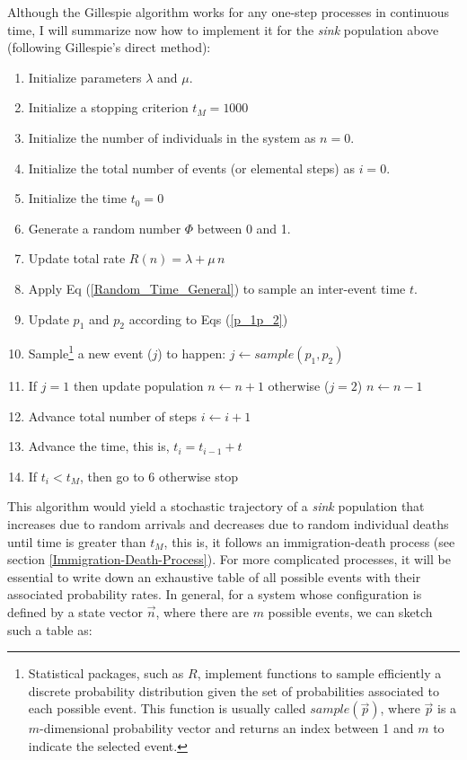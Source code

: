 Although the Gillespie algorithm works for any one-step processes in continuous time, I will summarize now how to implement it for the \textit{sink} population above (following Gillespie's direct method):
\begin{enumerate}
	\item Initialize parameters $\lambda$ and $\mu$. 
	\item Initialize a stopping criterion $t_M = 1000$
	\item Initialize the number of individuals in the system as $n=0$.
	\item Initialize the total number of events (or elemental steps) as $i=0$.
	\item Initialize the time $t_0 = 0$
	\item Generate a random number $\Phi$ between 0 and 1.
	\item Update total rate $R(n) = \lambda + \mu\,n$ 
	\item Apply Eq (\ref{Random_Time_General}) to sample an inter-event time $t$.
	\item Update $p_1$ and $p_2$ according to Eqs (\ref{p_1p_2}) 
	\item Sample\footnote{Statistical packages, such as $R$, implement functions to sample efficiently a discrete probability distribution given the set of probabilities associated to each possible event. This function is usually called $sample(\vec{p})$, where $\vec{p}$ is a $m$-dimensional probability vector and returns an index between 1 and $m$ to indicate the selected event.} a new event ($j$) to happen: $j \leftarrow sample(p_1, p_2)$ 
	\item If $j=1$ then update population $n \leftarrow n+1$ otherwise ($j=2$) $n \leftarrow n-1$
	\item Advance total number of steps $i \leftarrow i + 1$
	\item Advance the time, this is, $t_i = t_{i-1} + t$
	\item If $t_i < t_M$, then go to 6 otherwise stop
\end{enumerate}
This algorithm would yield a stochastic trajectory of a \textit{sink} population that increases due to random arrivals and decreases due to random individual deaths until time is greater than $t_M$, this is, it follows an immigration-death process (see section \ref{Immigration-Death-Process}). For more complicated processes, it will be essential to write down an exhaustive table of all possible events with their associated probability rates. In general, for a system whose configuration is defined by a state vector $\vec{n}$, where there are $m$ possible events, we can sketch such a table as:
